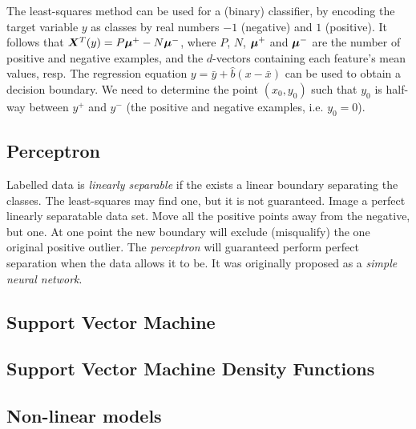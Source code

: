 The least-squares method can be used for a (binary) classifier, by encoding the target variable $y$ as classes by real numbers $-1$ (negative) and $1$ (positive).
It follows that $\matrixsym{X}^T\vectorsym(y) = P \vectorsym{\mu^+} - N \vectorsym{\mu^-}$, where $P$, $N$, $\vectorsym{\mu^+}$ and $\vectorsym{\mu^-}$ are the number of positive and negative examples, and the $d$-vectors containing each feature's mean values, resp.
The regression equation $y = \bar{y} + \hat{b}(x - \bar{x})$ can be used to obtain a decision boundary.
We need to determine the point $(x_0, y_0)$ such that $y_0$ is half-way between $y^+$ and $y^-$ (the positive and negative examples, i.e. $y_0 = 0$).

\subsection{Perceptron}\label{perceptron}
Labelled data is \emph{linearly separable} if the exists a linear boundary separating the classes.
The least-squares may find one, but it is not guaranteed.
Image a perfect linearly separatable data set.
Move all the positive points away from the negative, but one.
At one point the new boundary will exclude (misqualify) the one original positive outlier.
The \emph{perceptron} will guaranteed perform perfect separation when the data allows it to be.
It was originally proposed as a \emph{simple neural network}.


\subsection{Support Vector Machine}\label{svm-explained}
\subsection{Support Vector Machine Density Functions}\label{svm-pdf}
\subsection{Non-linear models}\label{non-linear}


